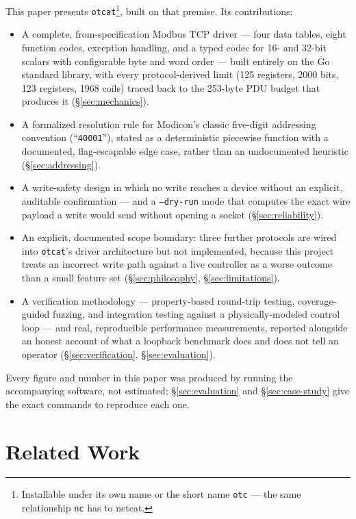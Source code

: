 \documentclass[10pt,conference]{IEEEtran}
\newcommand{\otcat}{\texttt{otcat}}
\newcommand{\code}[1]{\texttt{#1}}
\begin{document}
This paper presents \otcat\footnote{Installable under its own name or
the short name \texttt{otc} --- the same relationship \texttt{nc} has
to netcat.}, built on that premise. Its contributions:

\begin{itemize}
\item A complete, from-specification Modbus TCP driver --- four data
tables, eight function codes, exception handling, and a typed codec for
16- and 32-bit scalars with configurable byte and word order --- built
entirely on the Go standard library, with every protocol-derived limit
(125 registers, 2000 bits, 123 registers, 1968 coils) traced back to
the 253-byte PDU budget that produces it (\S\ref{sec:mechanics}).
\item A formalized resolution rule for Modicon's classic five-digit
addressing convention (``\code{40001}''), stated as a deterministic
piecewise function with a documented, flag-escapable edge case, rather
than an undocumented heuristic (\S\ref{sec:addressing}).
\item A write-safety design in which no write reaches a device without
an explicit, auditable confirmation --- and a \code{--dry-run} mode that
computes the exact wire payload a write would send without opening a
socket (\S\ref{sec:reliability}).
\item An explicit, documented scope boundary: three further protocols
are wired into \otcat's driver architecture but not implemented, because
this project treats an incorrect write path against a live controller
as a worse outcome than a small feature set (\S\ref{sec:philosophy},
\S\ref{sec:limitations}).
\item A verification methodology --- property-based round-trip testing,
coverage-guided fuzzing, and integration testing against a
physically-modeled control loop --- and real, reproducible performance
measurements, reported alongside an honest account of what a loopback
benchmark does and does not tell an operator (\S\ref{sec:verification},
\S\ref{sec:evaluation}).
\end{itemize}

Every figure and number in this paper was produced by running the
accompanying software, not estimated; \S\ref{sec:evaluation} and
\S\ref{sec:case-study} give the exact commands to reproduce each one.


\section{Related Work}
\label{sec:related-work}
\end{document}
